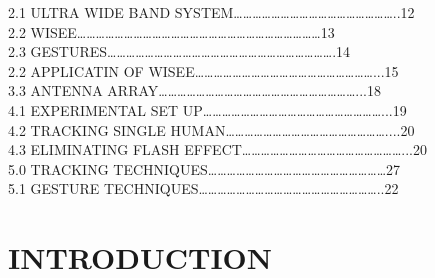 \documentclass[a4paper,12pt,oneside]{article}
\begin{document}
\setlength{\baselineskip}{1.0\baselineskip}
\newpage
\begin{center}
\tableofcontents
\end{center}
\newpage
\thispagestyle{plain}
\begin{center}
\vspace{5mm}
\listoffigures
\vspace{5mm}
2.1 ULTRA WIDE BAND SYSTEM……………………………………………..12
\\
\vspace{4mm}
2.2 WISEE……………………………………………………………………13
\\
\vspace{4mm}
2.3 GESTURES……………………………………………………………….14
\\
\vspace{4mm}
2.2 APPLICATIN OF WISEE…………………………………………………...15
\\
\vspace{4mm}
3.3 ANTENNA ARRAY………………………………………………………...18
\\
\vspace{4mm}
4.1 EXPERIMENTAL SET UP…………………………………………………...19
\\
\vspace{4mm}
4.2 TRACKING SINGLE HUMAN……………………………………………....20
\\
\vspace{4mm}
4.3 ELIMINATING FLASH EFFECT……………………………………………...20
\\
\vspace{4mm}
5.0 TRACKING TECHNIQUES…………………………………………………27
\\
\vspace{4mm}
5.1 GESTURE TECHNIQUES…………………………………………………..22

\end{center}





\newpage
\rfoot{\thepage}



\rfoot{\thepage}

\renewcommand{\headrulewidth}{0.0pt}
\renewcommand{\footrulewidth}{0.0pt}




\renewcommand{\headrulewidth}{0.0pt}
\renewcommand{\footrulewidth}{0.0pt}



\section{INTRODUCTION}
\end{document}
